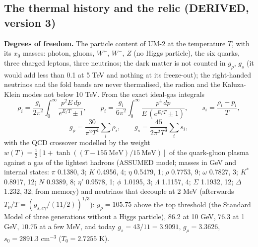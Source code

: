 \documentclass[
  10pt,
]{article}
\begin{document}
\hypertarget{the-thermal-history-and-the-relic-derived-version-3}{%
\subsection{The thermal history and the relic (DERIVED, version
3)}\label{the-thermal-history-and-the-relic-derived-version-3}}

\textbf{Degrees of freedom.} The particle content of UM-2 at the
temperature \(T\), with its \(x_0\) masses: photon, gluons, \(W^+\),
\(W^-\), \(Z\) (no Higgs particle), the six quarks, three charged
leptons, three neutrinos; the dark matter is not counted in \(g_\rho\),
\(g_s\) (it would add less than 0.1 at 5 TeV and nothing at its
freeze-out); the right-handed neutrinos and the fold bands are never
thermalised, the radion and the Kaluza-Klein modes not below 10 TeV.
From the exact ideal-gas integrals
\[ \rho_i = \frac{g_i}{2\pi^2}\int_0^\infty\frac{p^2E\,dp}{e^{E/T}\pm1},\qquad p_i = \frac{g_i}{6\pi^2}\int_0^\infty\frac{p^4\,dp}{E\,(e^{E/T}\pm1)},\qquad s_i = \frac{\rho_i + p_i}{T},\]
\[ g_\rho = \frac{30}{\pi^2T^4}\sum_i\rho_i,\qquad g_s = \frac{45}{2\pi^2T^3}\sum_is_i , \]
with the QCD crossover modelled by the weight
\(w(T) = \frac12[1 + \tanh((T - 155\ \text{MeV})/15\ \text{MeV})]\) of
the quark-gluon plasma against a gas of the lightest hadrons (ASSUMED
model; masses in GeV and internal states: \(\pi\) 0.1380, 3; \(K\)
0.4956, 4; \(\eta\) 0.5479, 1; \(\rho\) 0.7753, 9; \(\omega\) 0.7827, 3;
\(K^*\) 0.8917, 12; \(N\) 0.9389, 8; \(\eta'\) 0.9578, 1; \(\phi\)
1.0195, 3; \(\Lambda\) 1.1157, 4; \(\Sigma\) 1.1932, 12; \(\Delta\)
1.232, 32; from memory) and neutrinos that decouple at 2 MeV (afterwards
\(T_\nu/T = (g_{s,e\gamma}/(11/2))^{1/3}\)): \(g_\rho = 105.75\) above
the top threshold (the Standard Model of three generations without a
Higgs particle), \(86.2\) at 10 GeV, \(76.3\) at 1 GeV, \(10.75\) at a
few MeV, and today \(g_s = 43/11 = 3.9091\), \(g_\rho = 3.3626\),
\(s_0 = 2891.3\) cm\(^{-3}\) (\(T_0 = 2.7255\) K).
\end{document}
